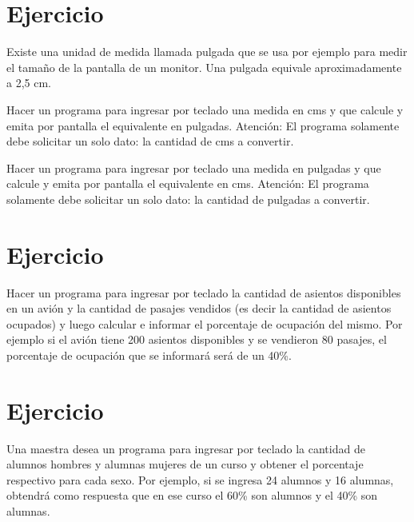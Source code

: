\documentclass[12pt,a4paper,twoside]{article}
\begin{document}
\newpage
\section{Ejercicio }

\hspace*{1cm}Existe una unidad de medida llamada pulgada que se usa por ejemplo para medir el tamaño de la pantalla de un monitor. Una pulgada equivale aproximadamente a 2,5 cm.
\begin{list}{•}{}
\item Hacer un programa para ingresar por teclado una medida en cms y que calcule y emita por pantalla el equivalente en pulgadas.
\linebreak Atención: El programa solamente debe solicitar un solo dato: la cantidad de cms a convertir.
\item Hacer un programa para ingresar por teclado una medida en pulgadas y que calcule y emita por pantalla el equivalente en cms.
\linebreak Atención: El programa solamente debe solicitar un solo dato: la cantidad de pulgadas a
convertir.
\end{list}

\newpage
\section{Ejercicio }

\hspace*{1cm}Hacer un programa para ingresar por teclado la cantidad de asientos disponibles en un avión y la cantidad de pasajes vendidos (es decir la cantidad de asientos ocupados) y luego calcular e informar el porcentaje de ocupación del mismo.
Por ejemplo si el avión tiene 200 asientos disponibles y se vendieron 80 pasajes, el porcentaje
de ocupación que se informará será de un 40\%.

\newpage
\section{Ejercicio }

\hspace*{1cm}Una maestra desea un programa para ingresar por teclado la cantidad de alumnos hombres y alumnas mujeres de un curso y obtener el porcentaje respectivo para cada sexo.
Por ejemplo, si se ingresa 24 alumnos y 16 alumnas, obtendrá como respuesta que en ese
curso el 60\% son alumnos y el 40\% son alumnas.
\end{document}
